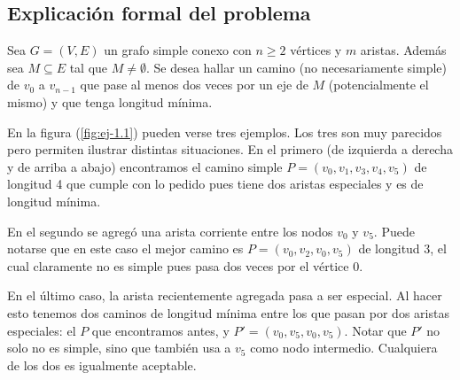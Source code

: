 \subsection{Explicación formal del problema}
Sea $G=(V,E)$ un grafo simple conexo con $n\geq 2$ vértices y $m$ aristas. Además sea $M\subseteq E$ tal que $M\neq \emptyset$. Se desea hallar un camino (no necesariamente simple) de $v_0$ a $v_{n-1}$ que pase al menos dos veces por un eje de $M$ (potencialmente el mismo) y que tenga longitud mínima.

En la figura (\ref{fig:ej-1.1}) pueden verse tres ejemplos. Los tres son muy parecidos pero permiten ilustrar distintas situaciones. En el primero (de izquierda a derecha y de arriba a abajo) encontramos el camino simple $P=(v_0,v_1,v_3,v_4,v_5)$ de longitud 4 que cumple con lo pedido pues tiene dos aristas especiales y es de longitud mínima. 

En el segundo se agregó una arista corriente entre los nodos $v_0$ y $v_5$. Puede notarse que en este caso el mejor camino es $P=(v_0,v_2,v_0,v_5)$ de longitud 3, el cual claramente no es simple pues pasa dos veces por el vértice 0. 

En el último caso, la arista recientemente agregada pasa a ser especial. Al hacer esto tenemos dos caminos de longitud mínima entre los que pasan por dos aristas especiales: el $P$ que encontramos antes, y $P'=(v_0, v_5, v_0, v_5)$. Notar que $P'$ no solo no es simple, sino que también usa a $v_5$ como nodo intermedio. Cualquiera de los dos es igualmente aceptable.

